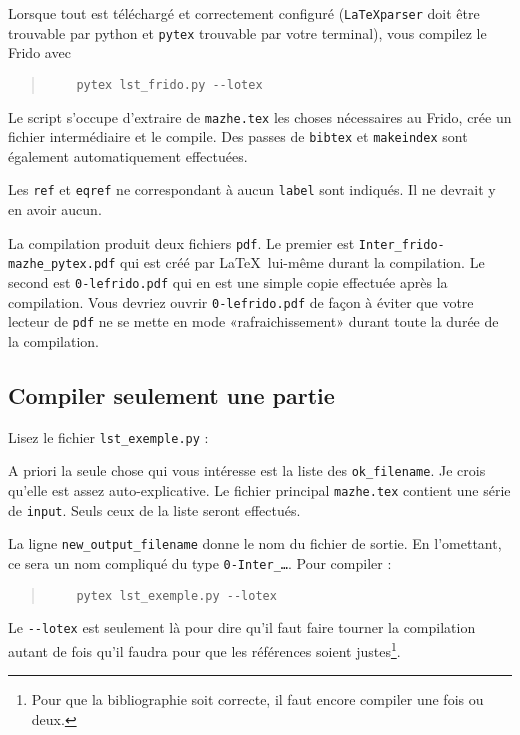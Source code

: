 \documentclass[a4paper,12pt]{article}
\newcommand{\info}[1]{\texttt{#1}}
\begin{document}
Lorsque tout est téléchargé et correctement configuré (\info{LaTeXparser} doit être trouvable par python et \info{pytex} trouvable par votre terminal), vous compilez le Frido avec
\begin{quote}
    \begin{verbatim}
    pytex lst_frido.py --lotex
    \end{verbatim}
\end{quote}
Le script s'occupe d'extraire de \info{mazhe.tex} les choses nécessaires au Frido, crée un fichier intermédiaire et le compile. Des passes de \info{bibtex} et \info{makeindex} sont également automatiquement effectuées.

Les \info{ref} et \info{eqref} ne correspondant à aucun \info{label} sont indiqués. Il ne devrait y en avoir aucun.

La compilation produit deux fichiers \info{pdf}. Le premier est \info{Inter\_frido-mazhe\_pytex.pdf} qui est créé par \LaTeX\ lui-même durant la compilation. Le second est \info{0-lefrido.pdf} qui en est une simple copie effectuée après la compilation. Vous devriez ouvrir \info{0-lefrido.pdf} de façon à éviter que votre lecteur de \info{pdf} ne se mette en mode «rafraichissement» durant toute la durée de la compilation.

\subsection{Compiler seulement une partie}

Lisez le fichier \info{lst\_exemple.py} :



A priori la seule chose qui vous intéresse est la liste des \texttt{ok\_filename}. Je crois qu'elle est assez auto-explicative. Le fichier principal \info{mazhe.tex} contient une série de \info{input}. Seuls ceux de la liste seront effectués.

La ligne \info{new\_output\_filename} donne le nom du fichier de sortie. En l'omettant, ce sera un nom compliqué du type \info{0-Inter\_\ldots}. Pour compiler :
\begin{quote}
    \begin{verbatim}
    pytex lst_exemple.py --lotex
    \end{verbatim}
\end{quote}
Le \verb+--lotex+ est seulement là pour dire qu'il faut faire tourner la compilation autant de fois qu'il faudra pour que les références soient justes\footnote{Pour que la bibliographie soit correcte, il faut encore compiler une fois ou deux.}. 
\end{document}
